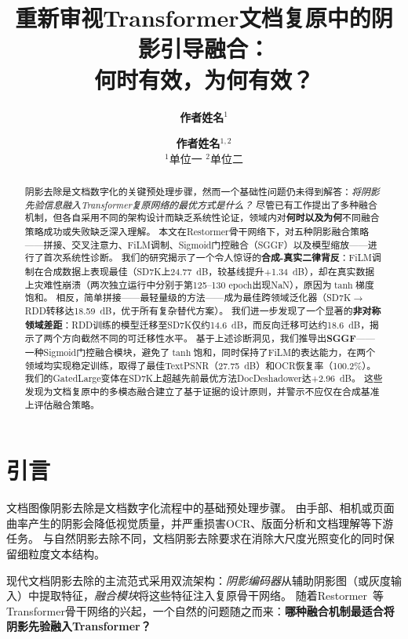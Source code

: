 \documentclass[11pt]{ctexart}
\title{\textbf{重新审视Transformer文档复原中的阴影引导融合：\\何时有效，为何有效？}}
\author{
  \textbf{作者姓名}$^{1}$ \and \textbf{作者姓名}$^{1,2}$ \\
  $^{1}$单位一 \quad $^{2}$单位二
}
\date{}
\begin{document}
\maketitle

\begin{abstract}
阴影去除是文档数字化的关键预处理步骤，然而一个基础性问题仍未得到解答：\textit{将阴影先验信息融入Transformer复原网络的最优方式是什么？}
尽管已有工作提出了多种融合机制，但各自采用不同的架构设计而缺乏系统性论证，领域内对\textbf{何时以及为何}不同融合策略成功或失败缺乏深入理解。
本文在Restormer骨干网络下，对五种阴影融合策略——拼接、交叉注意力、FiLM调制、Sigmoid门控融合（SGGF）以及模型缩放——进行了首次系统性诊断。
我们的研究揭示了一个令人惊讶的\textbf{合成-真实二律背反}：FiLM调制在合成数据上表现最佳（SD7K上24.77~dB，较基线提升+1.34~dB），却在真实数据上灾难性崩溃（两次独立运行中分别于第125--130 epoch出现NaN），原因为$\tanh$梯度饱和。
相反，简单拼接——最轻量级的方法——成为最佳跨领域泛化器（SD7K$\rightarrow$RDD转移达18.59~dB，优于所有复杂替代方案）。
我们进一步发现了一个显著的\textbf{非对称领域差距}：RDD训练的模型迁移至SD7K仅约14.6~dB，而反向迁移可达约18.6~dB，揭示了两个方向截然不同的可迁移性水平。
基于上述诊断洞见，我们推导出\textbf{SGGF}——一种Sigmoid门控融合模块，避免了$\tanh$饱和，同时保持了FiLM的表达能力，在两个领域均实现稳定训练，取得了最佳TextPSNR（27.75~dB）和OCR恢复率（100.2\%）。
我们的GatedLarge变体在SD7K上超越先前最优方法DocDeshadower达+2.96~dB。
这些发现为文档复原中的多模态融合建立了基于证据的设计原则，并警示不应仅在合成基准上评估融合策略。
\end{abstract}

\section{引言}

文档图像阴影去除是文档数字化流程中的基础预处理步骤。
由手部、相机或页面曲率产生的阴影会降低视觉质量，并严重损害OCR、版面分析和文档理解等下游任务。
与自然阴影去除不同，文档阴影去除要求在消除大尺度光照变化的同时保留细粒度文本结构。

现代文档阴影去除的主流范式采用双流架构：\textit{阴影编码器}从辅助阴影图（或灰度输入）中提取特征，\textit{融合模块}将这些特征注入复原骨干网络。
随着Restormer~\cite{zamir2022restormer}等Transformer骨干网络的兴起，一个自然的问题随之而来：\textbf{哪种融合机制最适合将阴影先验融入Transformer？}
\end{document}
